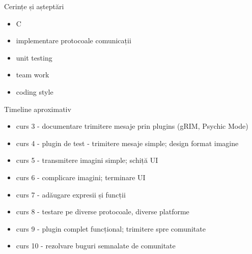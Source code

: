 \documentclass{beamer}
\begin{document}
\begin{frame}{Cerințe și așteptări}
  \begin{itemize}
    \item C
    \item implementare protocoale comunicații
    \item unit testing
    \item team work
    \item coding style
  \end{itemize}
\end{frame}

\begin{frame}{Timeline aproximativ}
  \begin{itemize}[<+->]
    \item curs 3 - documentare trimitere mesaje prin plugins (gRIM, Psychic
    Mode)
    \item curs 4 - plugin de test - trimitere mesaje simple; design format
    imagine
    \item curs 5 - transmitere imagini simple; schiță UI
    \item curs 6 - complicare imagini; terminare UI
    \item curs 7 - adăugare expresii și funcții
    \item curs 8 - testare pe diverse protocoale, diverse platforme
    \item curs 9 - plugin complet funcțional; trimitere spre comunitate
    \item curs 10 - rezolvare buguri semnalate de comunitate
  \end{itemize}
\end{frame}
\end{document}
